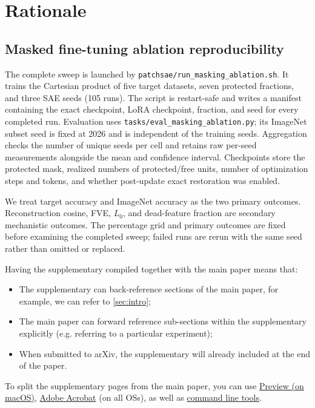 \clearpage
\setcounter{page}{1}
\maketitlesupplementary


\section{Rationale}
\label{sec:rationale}
% 
\subsection{Masked fine-tuning ablation reproducibility}

The complete sweep is launched by
\texttt{patchsae/run\_masking\_ablation.sh}. It trains the Cartesian product of
five target datasets, seven protected fractions, and three SAE seeds (105 runs).
The script is restart-safe and writes a manifest containing the exact checkpoint,
LoRA checkpoint, fraction, and seed for every completed run. Evaluation uses
\texttt{tasks/eval\_masking\_ablation.py}; its ImageNet subset seed is fixed at
2026 and is independent of the training seeds. Aggregation checks the number of
unique seeds per cell and retains raw per-seed measurements alongside the mean
and confidence interval. Checkpoints store the protected mask, realized numbers
of protected/free units, number of optimization steps and tokens, and whether
post-update exact restoration was enabled.

We treat target accuracy and ImageNet accuracy as the two primary outcomes.
Reconstruction cosine, FVE, $L_0$, and dead-feature fraction are secondary
mechanistic outcomes. The percentage grid and primary outcomes are fixed before
examining the completed sweep; failed runs are rerun with the same seed rather
than omitted or replaced.









Having the supplementary compiled together with the main paper means that:
% 
\begin{itemize}
\item The supplementary can back-reference sections of the main paper, for example, we can refer to \cref{sec:intro};
\item The main paper can forward reference sub-sections within the supplementary explicitly (e.g. referring to a particular experiment); 
\item When submitted to arXiv, the supplementary will already included at the end of the paper.
\end{itemize}
% 
To split the supplementary pages from the main paper, you can use \href{https://support.apple.com/en-ca/guide/preview/prvw11793/mac#:~:text=Delete%20a%20page%20from%20a,or%20choose%20Edit%20%3E%20Delete).}{Preview (on macOS)}, \href{https://www.adobe.com/acrobat/how-to/delete-pages-from-pdf.html#:~:text=Choose%20%E2%80%9CTools%E2%80%9D%20%3E%20%E2%80%9COrganize,or%20pages%20from%20the%20file.}{Adobe Acrobat} (on all OSs), as well as \href{https://superuser.com/questions/517986/is-it-possible-to-delete-some-pages-of-a-pdf-document}{command line tools}.
